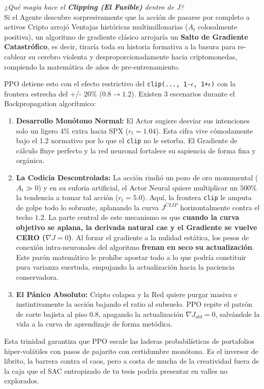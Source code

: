 \documentclass[11pt]{article}
\begin{document}
\vspace{2mm}
\noindent\textit{¿Qué magia hace el \textbf{Clipping (El Fusible)} dentro de J?} \\
Si el Agente descubre sorpresivamente que la acción de pasarse por completo a activos Cripto arrojó Ventajas históricas multimillonarias ($A_t$ colosalmente positiva), un algoritmo de gradiente clásico arrojaría un \textbf{Salto de Gradiente Catastrófico}, es decir, tiraría toda su historia formativa a la basura para re-cablear su cerebro violenta y desproporcionadamente hacia criptomonedas, rompiendo la matemática de años de pre-entrenamiento.

PPO detiene esto con el efecto restrictivo del \texttt{clip(..., 1-$\epsilon$, 1+$\epsilon$)} con la frontera estrecha del +/- 20\% ($0.8 \to 1.2$). Existen 3 escenarios durante el Backpropagation algorítmico:
\begin{enumerate}
    \item \textbf{Desarrollo Monótono Normal:} El Actor sugiere desviar sus intenciones solo un ligero 4\% extra hacia SPX ($r_t=1.04$). Esta cifra vive cómodamente bajo el 1.2 normativo por lo que el \texttt{clip} no le estorba. El Gradiente de cálculo fluye perfecto y la red neuronal fortalece su sapiencia de forma fina y orgánica.
    \item \textbf{La Codicia Descontrolada:} La acción rindió un pozo de oro monumental ($A_t \gg 0$) y en su euforia artificial, el Actor Neural quiere multiplicar un $500\%$ la tendencia a tomar tal acción ($r_t=5.0$). Aquí, la frontera \texttt{clip} le amputa de golpe todo lo sobrante, aplanando la curva $J^{CLIP}$ horizontalmente contra el techo $1.2$. La parte central de este mecanismo es que \textbf{cuando la curva objetivo se aplana, la derivada natural cae y el Gradiente se vuelve CERO ($\nabla J = 0$)}. Al forzar el gradiente a la nulidad estática, los pesos de conexión intra-neuronales del algoritmo \textbf{frenan en seco su actualización}. Este parón matemático le prohíbe apostar todo a lo que podría constituir pura varianza suertuda, empujando la actualización hacia la paciencia conservadora.
    \item \textbf{El Pánico Absoluto:} Cripto colapsa y la Red quiere purgar masiva e instintivamente la acción bajando el ratio al subsuelo. PPO repite el patrón de corte bajista al piso 0.8, apagando la actualización $\nabla J_{old} = 0$, salvándole la vida a la curva de aprendizaje de forma metódica.
\end{enumerate}
Esta trinidad garantiza que PPO escale las laderas probabilísticas de portafolios hiper-volátiles con pasos de pajarito con certidumbre monótona. Es el inversor de librito, la barrera contra el caos, pero a costa de mucha de la creatividad fuera de la caja que el SAC entropizado de tu tesis podría presentar en valles no explorados.
\end{document}
